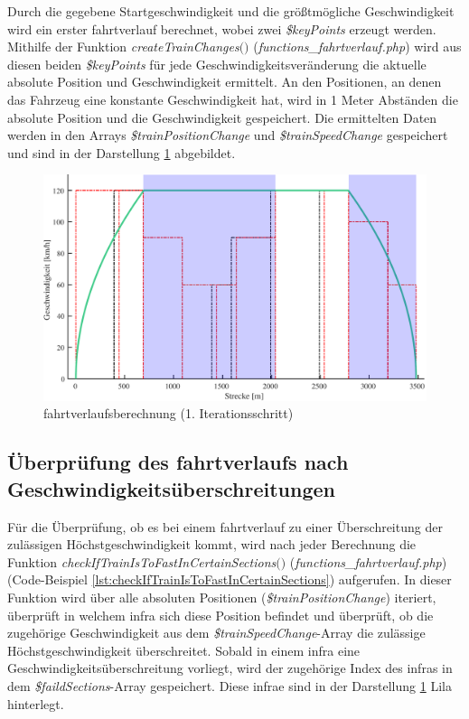 Durch die gegebene Startgeschwindigkeit und die größtmögliche Geschwindigkeit wird ein erster \Gls{fahrtverlauf} berechnet, wobei zwei \textit{\$keyPoints} erzeugt werden. Mithilfe der Funktion \textit{createTrainChanges$($$)$} (\textit{functions\_fahrtverlauf.php}) wird aus diesen beiden \textit{\$keyPoints} für jede Geschwindigkeitsveränderung die aktuelle absolute Position und Geschwindigkeit ermittelt. An den Positionen, an denen das Fahrzeug eine konstante Geschwindigkeit hat, wird in 1 Meter Abständen die absolute Position und die Geschwindigkeit gespeichert. Die ermittelten Daten werden in den Arrays \textit{\$trainPositionChange} und \textit{\$trainSpeedChange} gespeichert und sind in der Darstellung \ref{fig:it3} abgebildet.
\begin{figure}
\includegraphics[width=\linewidth]{../images/matlab/it3.pdf}
\caption{\Gls{fahrtverlauf}sberechnung (1. Iterationsschritt)}
\label{fig:it3}
\end{figure}
\subsection{Überprüfung des \Gls{fahrtverlauf}s nach Geschwindigkeitsüberschreitungen} \label{überprüfung}
Für die Überprüfung, ob es bei einem \Gls{fahrtverlauf} zu einer Überschreitung der zulässigen Höchstgeschwindigkeit kommt, wird nach jeder Berechnung die Funktion \textit{check\-If\-Train\-Is\-To\-Fast\-In\-Certain\-Sec\-tions$($$)$} (\textit{functions\_fahrtverlauf.php}) (Code-Beispiel \ref{lst:checkIfTrainIsToFastInCertainSections}) aufgerufen. In dieser Funktion wird über alle absoluten Positionen (\textit{\$trainPositionChange}) iteriert, überprüft in welchem \ac{infra} sich diese Position befindet und überprüft, ob die zugehörige Geschwindigkeit aus dem \textit{\$trainSpeedChange}-Array die zulässige Höchstgeschwindigkeit überschreitet. Sobald in einem \ac{infra} eine Geschwindigkeitsüberschreitung vorliegt, wird der zugehörige Index des \ac{infra}s in dem \textit{\$faildSections}-Array gespeichert. Diese \ac{infra}e sind in der Darstellung \ref{fig:it3} Lila hinterlegt. 


